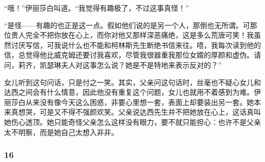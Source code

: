 \par “哦！”伊丽莎白叫道。“我觉得有趣极了，不过这事真怪！”
\par “是怪——有趣的也正是这一点。假如他们说的是另一个人，那倒也无所谓。可那位贵人完全不把你放在心上，而你对他又那样深恶痛绝，这是多么荒唐可笑！我虽然讨厌写信，可我说什么也不能和柯林斯先生断绝书信来往。唔，我每次读到他的信，总觉得他比威克姆还要讨我喜欢，尽管我很器重我那位女婿的厚颜和虚伪。请问，莉齐，凯瑟琳夫人对这事怎么说？她是不是特地来表示反对的？”
\par 女儿听到这句问话，只是付之一笑。其实，父亲问这句话时，丝毫也不疑心女儿和达西之间会有什么情意，因此他没有重复这个问题，女儿也就用不着感到为难。伊丽莎白从来没有像今天这么困惑，非要心里想一套，表面上却要装出另一套。她本来真想哭，可是又不得不强颜欢笑。父亲说达西先生并不把她放在心上，这话真叫她伤心透顶。她只能奇怪父亲怎么这样没有眼力，要不就只能担心：也许不是父亲太不明察，而是她自己太想入非非。




\subsubsection*{16}


